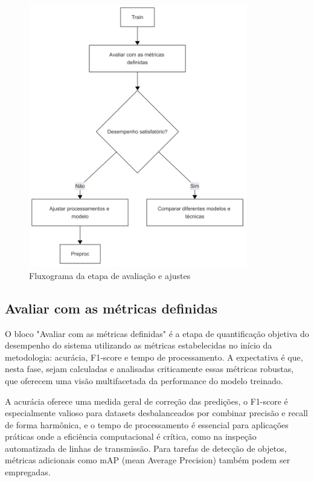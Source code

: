 \begin{figure}[H]
    \centering
    \caption{\label{fig:fluxograma_avaliacao}Fluxograma da etapa de avaliação e ajustes}
    \includegraphics[width=0.85\textwidth]{img/metodologia - 6 - avaliação.png}
\end{figure}

\subsection{Avaliar com as métricas definidas}
O bloco "Avaliar com as métricas definidas" é a etapa de quantificação objetiva do desempenho do sistema utilizando as métricas estabelecidas no início da metodologia: acurácia, F1-score e tempo de processamento. A expectativa é que, nesta fase, sejam calculadas e analisadas criticamente essas métricas robustas, que oferecem uma visão multifacetada da performance do modelo treinado.

A acurácia oferece uma medida geral de correção das predições, o F1-score é especialmente valioso para datasets desbalanceados por combinar precisão e recall de forma harmônica, e o tempo de processamento é essencial para aplicações práticas onde a eficiência computacional é crítica, como na inspeção automatizada de linhas de transmissão. Para tarefas de detecção de objetos, métricas adicionais como mAP (mean Average Precision) também podem ser empregadas.


